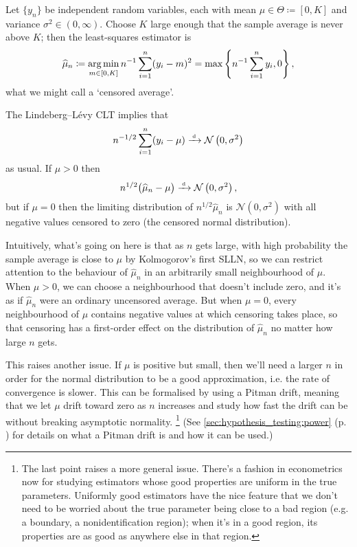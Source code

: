 \documentclass[11pt,letterpaper,reqno,oneside]{article}
\begin{document}
\begin{example}[nonnormality on the boundary]
	Let $\{ y_n \}$ be independent random variables, each with mean $\mu \in \Theta \coloneqq [0,K]$ and variance $\sigma^2 \in (0,\infty)$. Choose $K$ large enough that the sample average is never above $K$; then the least-squares estimator is
	\begin{equation*}
		\widehat{\mu}_n 
		\coloneqq \operatorname*{arg\,min}_{m\in[0,K]} n^{-1} \sum_{i=1}^n ( y_i - m )^2 
		= \max\left\{ n^{-1} \sum_{i=1}^n y_i , 0 \right\} ,
	\end{equation*}
	what we might call a `censored average'.
	
	The Lindeberg--Lévy CLT implies that
	\begin{equation*}
		n^{-1/2} \sum_{i=1}^n (y_i-\mu) 
		\xrightarrow{{\scriptscriptstyle \mathrm{\;d\;}}} \mathcal{N}\left( 0, \sigma^2 \right)
	\end{equation*}
	as usual. If $\mu>0$ then
	\begin{equation*}
		n^{1/2} \bigl( \widehat{\mu}_n - \mu \bigr) 
		\xrightarrow{{\scriptscriptstyle \mathrm{\;d\;}}} \mathcal{N}\left( 0, \sigma^2 \right) ,
	\end{equation*}
	but if $\mu=0$ then the limiting distribution of $n^{1/2} \widehat{\mu}_n$ is $\mathcal{N}\left( 0, \sigma^2 \right)$ with all negative values censored to zero (the censored normal distribution).

	Intuitively, what's going on here is that as $n$ gets large, with high probability the sample average is close to $\mu$ by Kolmogorov's first SLLN, so we can restrict attention to the behaviour of $\widehat{\mu}_n$ in an arbitrarily small neighbourhood of $\mu$. When $\mu>0$, we can choose a neighbourhood that doesn't include zero, and it's as if $\widehat{\mu}_n$ were an ordinary uncensored average. But when $\mu=0$, every neighbourhood of $\mu$ contains negative values at which censoring takes place, so that censoring has a first-order effect on the distribution of $\widehat{\mu}_n$ no matter how large $n$ gets.

	This raises another issue. If $\mu$ is positive but small, then we'll need a larger $n$ in order for the normal distribution to be a good approximation, i.e. the rate of convergence is slower. This can be formalised by using a Pitman drift, meaning that we let $\mu$ drift toward zero as $n$ increases and study how fast the drift can be without breaking asymptotic normality.%
		\footnote{The last point raises a more general issue. There's a fashion in econometrics now for studying estimators whose good properties are uniform in the true parameters. Uniformly good estimators have the nice feature that we don't need to be worried about the true parameter being close to a bad region (e.g. a boundary, a nonidentification region); when it's in a good region, its properties are as good as anywhere else in that region.}
	(See \cref{sec:hypothesis_testing:power} (p. \pageref{sec:hypothesis_testing:power}) for details on what a Pitman drift is and how it can be used.)


\end{example}
\end{document}

